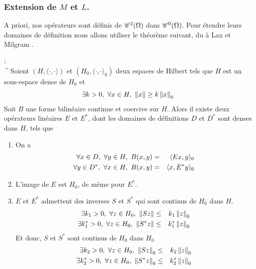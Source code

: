 \subsubsection*{Extension de \texorpdfstring{$M$}{M} et \texorpdfstring{$L$}{L}.}
A priori, nos opérateurs sont définis de $\mathscr{C}^2(\Omega)$ dans $\mathscr{C}^0(\Omega)$. Pour étendre leurs domaines de définition nous allons utiliser le théorème suivant, du à Lax et Milgram \cite[p.~171]{theory_PDE}.

\begin{theoreme}\label{thm_lax}: \\
$\ulcorner$Soient $(H, \langle \cdot, \cdot \rangle)$ et $(H_0, \langle \cdot, \cdot \rangle_0)$ deux espaces de Hilbert tels que $H$ est un sous-espace dense de $H_0$ et 
\begin{equation}\label{ineq_thm_lax}
    \exists k >0,\ \forall x \in H, \ \left\lVert x \right\rVert \geq k \left\lVert x \right\rVert_0
\end{equation}
Soit $B$ une forme bilinéaire continue et coercive sur $H$. Alors il existe deux opérateurs linéaires $E$ et $E^*$, dont les domaines de définitions $D$ et $D^*$ sont denses dans $H$, tels que
\begin{enumerate}
    \item On a
    \begin{eqnarray*}
        \forall x \in D,\ \forall y \in H, \ B(x,y) &=& \langle Ex, y \rangle_0 \\
        \forall y \in D^*,\ \forall x \in H, \ B(x,y) &=& \langle x, E^* y \rangle_0
    \end{eqnarray*}
    \item L'image de $E$ est $H_0$, de même pour $E^*$.
    \item $E$ et $E^*$ admettent des inverses $S$ et $S^*$ qui sont continus de $H_0$ dans $H$.
    \begin{eqnarray*}
        \exists k_1>0,\ \forall z \in H_0, \ \left\lVert Sz \right\rVert &\leq& k_1 \left\lVert z \right\rVert_0 \\
        \exists k_1^*>0,\ \forall z \in H_0, \ \left\lVert S^*z \right\rVert &\leq& k_1^* \left\lVert z \right\rVert_0
    \end{eqnarray*}
    Et donc, $S$ et $S^*$ sont continus de $H_0$ dans $H_0$
    \begin{eqnarray*}
        \exists k_2>0,\ \forall z \in H_0, \ \left\lVert Sz \right\rVert_0 &\leq& k_2 \left\lVert z \right\rVert_0 \\
        \exists k_2^*>0,\ \forall z \in H_0, \ \left\lVert S^*z \right\rVert_0 &\leq& k_2^* \left\lVert z \right\rVert_0
    \end{eqnarray*}
\end{enumerate}
\end{theoreme}


